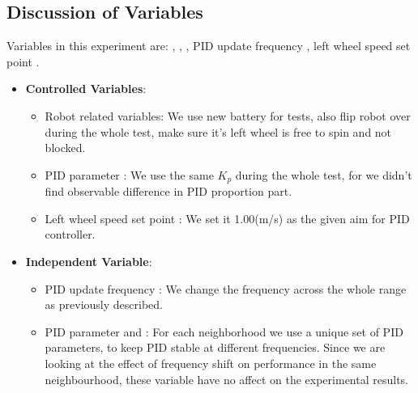 \documentclass[conference]{IEEEtran}
\begin{document}
\subsection{Discussion of Variables}
\label{DiscussionOfVariables}
Variables in this experiment are: , , , PID update frequency , left wheel speed set point .
\begin{itemize}
    \item \textbf{Controlled Variables}: 
        \begin{itemize}
            \item Robot related variables: We use new battery for tests, also flip robot over during the whole test, make sure it's left wheel is free to spin and not blocked.
            \item PID parameter : We use the same $K_{p}$ during the whole test, for we didn't find observable difference in PID proportion part.
            \item Left wheel speed set point : We set it 1.00(m/s) as the given aim for PID controller.
        \end{itemize}
    \item \textbf{Independent Variable}: 
        \begin{itemize}
            \item PID update frequency : We change the frequency across the whole range as previously described. 
            \item PID parameter  and : For each neighborhood we use a unique set of PID parameters, to keep PID stable at different frequencies. Since we are looking at the effect of frequency shift on performance in the same neighbourhood, these variable have no affect on the experimental results. 
        \end{itemize}

\end{itemize}
\end{document}
